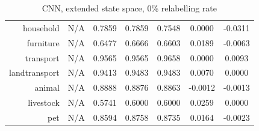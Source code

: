 \documentclass[11pt,a4paper]{article}
\begin{document}
\begin{table}[htbp]
\begin{tabular}{r|c|c|c|c|c|c}
household     & N/A    & 0.7859 & 0.7859 & 0.7548 & 0.0000 & -0.0311\\
furniture     & N/A    & 0.6477 & 0.6666 & 0.6603 & 0.0189 & -0.0063\\
transport     & N/A    & 0.9565 & 0.9565 & 0.9658 & 0.0000 & 0.0093\\
landtransport & N/A    & 0.9413 & 0.9483 & 0.9483 & 0.0070 & 0.0000\\
animal        & N/A    & 0.8888 & 0.8876 & 0.8863 & -0.0012 & -0.0013\\
livestock     & N/A    & 0.5741 & 0.6000 & 0.6000 & 0.0259 & 0.0000\\
pet           & N/A    & 0.8594 & 0.8758 & 0.8735 & 0.0164 & -0.0023
\end{tabular}
\caption{CNN, extended state space, 0\% relabelling rate}
\label{tab:cnn0acc}
\end{table}
\end{document}
